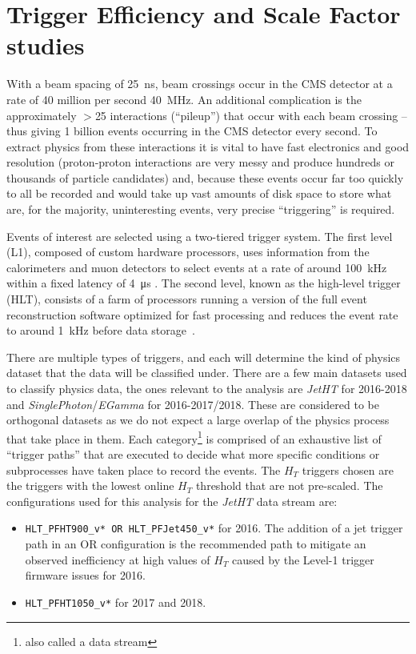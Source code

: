 \section{Trigger Efficiency and Scale Factor studies}


With a beam spacing of 25~\unit{ns}, beam crossings occur in the CMS detector at a rate of 40 million per second 40~\unit{\MHz}.
An additional complication is the approximately $>$25 interactions (``pileup'') that occur with each beam crossing -- thus giving 1 billion events occurring in the CMS detector every second. To extract physics from these interactions it is vital to have fast electronics and good resolution (proton-proton interactions are very messy and produce hundreds or thousands of particle candidates) and, because these events occur far too quickly to all be recorded and would take up vast amounts of disk space to store what are, for the majority, uninteresting events, very precise ``triggering'' is required.

Events of interest are selected using a two-tiered trigger system. The first level (L1), composed of custom hardware processors, uses information from the calorimeters and muon detectors to select events at a rate of around 100~\unit{kHz} within a fixed latency of 4~\unit{\us} \cite{CMS:2020cmk}. The second level, known as the high-level trigger (HLT), consists of a farm of processors running a version of the full event reconstruction software optimized for fast processing and reduces the event rate to around 1~\unit{kHz} before data storage~\cite{CMS:2016ngn}.

There are multiple types of triggers, and each will determine the kind of physics dataset that the data will be classified under. There are a few main datasets used to classify physics data, the ones relevant to the analysis are \emph{JetHT} for 2016-2018 and \emph{SinglePhoton}/\emph{EGamma} for 2016-2017/2018. These are considered to be orthogonal datasets as we do not expect a large overlap of the physics process that take place in them. Each category\footnote{also called a data stream} is comprised of an exhaustive list of ``trigger paths'' that are executed to decide what more specific conditions or subprocesses have taken place to record the events.
The $H_T$ triggers chosen are the triggers with the lowest online $H_T$ threshold that are not pre-scaled. The configurations used for this analysis for the \textit{JetHT} data stream are:

\begin{itemize}
	\item \verb|HLT_PFHT900_v* OR HLT_PFJet450_v*| for 2016. The addition of a jet trigger path in an OR configuration is the recommended path to mitigate an observed inefficiency at high values of $H_T$ caused by the Level-1 trigger firmware issues for 2016.
	\item \verb|HLT_PFHT1050_v*| for 2017 and 2018.
\end{itemize}

